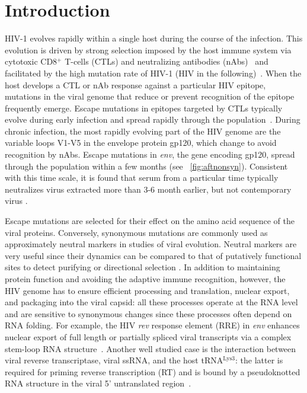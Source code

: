 \documentclass[rmp, twocolumn]{revtex4}
\newcommand{\rev}{\textit{rev}}
\newcommand{\env}{\textit{env}}
\begin{document}
\section{Introduction}
HIV-1 evolves rapidly within a single host during the course of the infection.
This evolution is driven by strong selection imposed by the host immune system
via cytotoxic CD8${}^+$ T-cells (CTLs) and neutralizing antibodies
(nAbs)~\citep{rambaut_causes_2004} and facilitated by the high mutation rate of
HIV-1 (HIV in the following)~\citep{mansky_lower_1995,abram_nature_2010}. When the host develops a CTL or
nAb response against a particular HIV epitope, mutations in the viral genome that
reduce or prevent recognition of the epitope frequently emerge. Escape mutations
in epitopes targeted by CTLs typically evolve during early infection and spread
rapidly through the population~\citep{mcmichael_immune_2009}. During chronic
infection, the most rapidly evolving part of the HIV genome are the variable
loops V1-V5 in the envelope protein gp120, which change to avoid recognition by
nAbs. Escape mutations in \env, the gene encoding gp120, spread through the
population within a few months (see \figurename~\ref{fig:aftnonsyn}).
Consistent with this time scale, it is found that serum from a particular time
typically neutralizes virus extracted more than 3-6 month earlier, but not contemporary
virus \citep{richman_rapid_2003}.

Escape mutations are selected for their effect on the amino acid sequence
of the viral proteins. Conversely, synonymous mutations are commonly used as
approximately neutral markers in studies of viral evolution. Neutral markers are
very useful since their dynamics can be compared to that of putatively
functional sites to detect purifying or directional selection
\citep{Bhatt:2011p43255,Hurst:2002p32608,Chen:2004p22606}. In addition to
maintaining protein function and avoiding the adaptive immune recognition,
however, the HIV genome has to ensure efficient processing and translation,
nuclear export, and packaging into the viral capsid: all these processes operate
at the RNA level and are sensitive to synonymous changes since these processes
often depend on RNA folding. For example, the HIV \rev{} response element (RRE)
in \env{} enhances nuclear export of full length or partially spliced viral
transcripts via a complex stem-loop RNA structure~\citep{fernandes_hiv-1_2012}.
Another well studied case is the interaction between viral reverse
transcriptase, viral ssRNA, and the host tRNA$^\text{Lys3}$: the latter is
required for priming reverse transcription (RT) and is bound by a pseudoknotted
RNA structure in the viral 5' untranslated region~\citep{barat_interaction_1991,
paillart_vitro_2002}.
\end{document}
